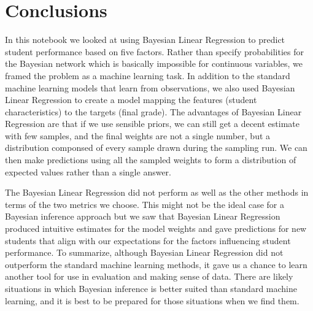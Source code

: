 \documentclass[11pt]{article}
\begin{document}
    \hypertarget{conclusions}{%
\section{Conclusions}\label{conclusions}}

In this notebook we looked at using Bayesian Linear Regression to
predict student performance based on five factors. Rather than specify
probabilities for the Bayesian network which is basically impossible for
continuous variables, we framed the problem as a machine learning task.
In addition to the standard machine learning models that learn from
observations, we also used Bayesian Linear Regression to create a model
mapping the features (student characteristics) to the targets (final
grade). The advantages of Bayesian Linear Regression are that if we use
sensible priors, we can still get a decent estimate with few samples,
and the final weights are not a single number, but a distribution
componsed of every sample drawn during the sampling run. We can then
make predictions using all the sampled weights to form a distribution of
expected values rather than a single answer.

The Bayesian Linear Regression did not perform as well as the other
methods in terms of the two metrics we choose. This might not be the
ideal case for a Bayesian inference approach but we saw that Bayesian
Linear Regression produced intuitive estimates for the model weights and
gave predictions for new students that align with our expectations for
the factors influencing student performance. To summarize, although
Bayesian Linear Regression did not outperform the standard machine
learning methods, it gave us a chance to learn another tool for use in
evaluation and making sense of data. There are likely situations in
which Bayesian inference is better suited than standard machine
learning, and it is best to be prepared for those situations when we
find them.


    
    
    
    
\end{document}
